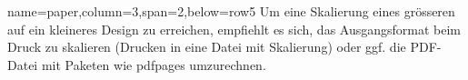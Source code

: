 \documentclass[
	paper=a0,%
	style=ruled, %
	]{bfhsciposter}
\let\pck\textsf
\begin{document}
\begin{tcbposter}[
		poster={
				columns=4,
				rows=7,
				spacing=1cm,
			},]
\begin{posterboxenv}[title=Papierformat]{name=paper,column=3,span=2,below=row5}
		Um eine Skalierung eines grösseren auf ein kleineres Design zu erreichen, empfiehlt es sich, das Ausgangsformat beim Druck zu skalieren (Drucken in eine Datei mit Skalierung) oder ggf. die PDF-Datei mit Paketen wie \pck{pdfpages} umzurechnen.
	\end{posterboxenv}

\end{tcbposter}
\end{document}
